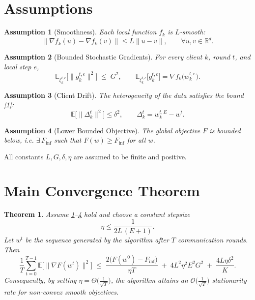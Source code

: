 \documentclass{article}
\newtheorem{theorem}{Theorem}
\newtheorem{assumption}{Assumption}
\begin{document}
\section*{Assumptions}
\begin{assumption}[Smoothness]\label{asm:smooth}
Each local function $f_k$ is $L$‑smooth:
\[
\|\nabla f_k(u)-\nabla f_k(v)\|\le L\|u-v\|,\qquad\forall u,v\in\mathbb{R}^d.
\]
\end{assumption}

\begin{assumption}[Bounded Stochastic Gradients]\label{asm:bounded}
For every client $k$, round $t$, and local step $e$,
\[
\mathbb{E}_{\xi_{k}^{t,e}}\!\big[\|g_{k}^{t,e}\|^2\big]\;\le\; G^2,
\qquad 
\mathbb{E}_{\xi_{k}^{t,e}}\!\big[g_{k}^{t,e}\big]=\nabla f_k\big(w_{k}^{t,e}\big).
\]
\end{assumption}

\begin{assumption}[Client Drift]\label{asm:drift}
The heterogeneity of the data satisfies the bound \eqref{1}:
\[
\mathbb{E}\!\big[\|\Delta_k^{t}\|^2\big]\le\delta^2,\qquad
\Delta_k^{t}=w_{k}^{t,E}-w^{t}.
\]
\end{assumption}

\begin{assumption}[Lower Bounded Objective]\label{asm:lb}
The global objective $F$ is bounded below, i.e. $\exists\,F_{\inf}$ such that
$F(w)\ge F_{\inf}$ for all $w$.
\end{assumption}

All constants $L,G,\delta,\eta$ are assumed to be finite and positive.

\section*{Main Convergence Theorem}
\begin{theorem}\label{thm:main}
Assume \ref{asm:smooth}–\ref{asm:lb} hold and choose a constant stepsize
\[
\eta \le \frac{1}{2L\,(E+1)}.
\]
Let $w^{t}$ be the sequence generated by the algorithm after $T$ communication
rounds. Then
\[
\frac{1}{T}\sum_{t=0}^{T-1}\mathbb{E}\!\big[\|\nabla F(w^{t})\|^2\big]
\;\le\;
\frac{2\big(F(w^{0})-F_{\inf}\big)}{\eta T}
\;+\;
4L^2\eta^2E^2G^2
\;+\;
\frac{4L\eta\delta^2}{K}.
\tag{2}
\]
Consequently, by setting $\eta = \Theta\!\big(\tfrac{1}{\sqrt{T}}\big)$,
the algorithm attains an $\mathcal{O}\!\big(\tfrac{1}{\sqrt{T}}\big)$
stationarity rate for non‑convex smooth objectives.
\end{theorem}
\end{document}
